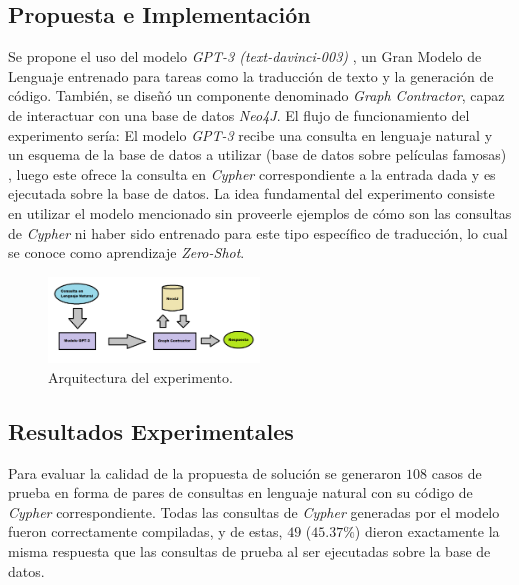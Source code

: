 \documentclass[a4paper,10pt,twocolumn]{article}
\begin{document}
\subsection{Propuesta e Implementación \cite{repo}}
Se propone el uso del modelo \textit{GPT-3 (text-davinci-003)} \cite{gpt3}, un Gran Modelo de Lenguaje entrenado para tareas como la traducción de texto y la generación de código. También, se diseñó un componente denominado \textit{Graph Contractor}, capaz de interactuar con una base de datos \textit{Neo4J}. El flujo de funcionamiento del experimento sería: El modelo \textit{GPT-3} recibe una consulta en lenguaje natural y un esquema \cite{dbschema} de la base de datos a utilizar (base de datos sobre películas famosas) \cite{moviesdb}, luego este ofrece la consulta en \textit{Cypher} correspondiente a la entrada dada y es ejecutada sobre la base de datos. La idea fundamental del experimento consiste en utilizar el modelo mencionado sin proveerle ejemplos de cómo son las consultas de \textit{Cypher} ni haber sido entrenado para este tipo específico de traducción, lo cual se conoce como aprendizaje \textit{Zero-Shot}.

\begin{figure}[h!]
\includegraphics[width=0.5\textwidth]{img/architecture.png}
\caption{Arquitectura del experimento.}\label{img:arch}
\end{figure}

\subsection{Resultados Experimentales}
Para evaluar la calidad de la propuesta de solución se generaron $108$ casos de prueba en forma de pares de consultas en lenguaje natural con su código de \textit{Cypher} correspondiente. Todas las consultas de \textit{Cypher} generadas por el modelo fueron correctamente compiladas, y  de estas, $49$ ($45.37\%$) dieron exactamente la misma respuesta que las consultas de prueba al ser ejecutadas sobre la base de datos.
\end{document}
